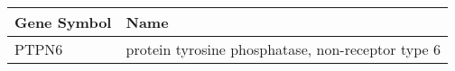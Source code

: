 \begin{tabular}{ll}
\toprule
Gene Symbol &                                              Name \\
\midrule
      PTPN6 & protein tyrosine phosphatase, non-receptor type 6 \\
\bottomrule
\end{tabular}
